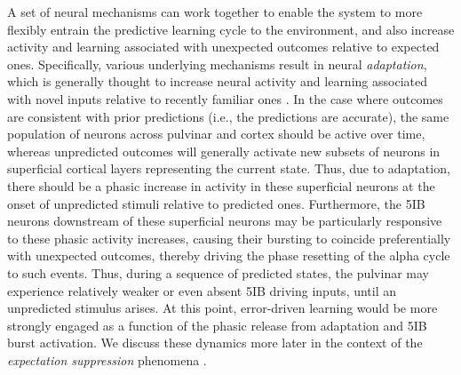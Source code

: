 \documentclass[11pt,twoside]{article}
\newif\myifpdf
\begin{document}
A set of neural mechanisms can work together to enable the system to more flexibly entrain the predictive learning cycle to the environment, and also increase activity and learning associated with unexpected outcomes relative to expected ones.  Specifically, various underlying mechanisms result in neural \emph{adaptation}, which is generally thought to increase neural activity and learning associated with novel inputs relative to recently familiar ones \citep{MullerMethaKrauskopfEtAl99,AbbottVarelaSenEtAl97,BretteGerstner05,Grill-SpectorHensonMartin06,Hennig13}.  In the case where outcomes are consistent with prior predictions (i.e., the predictions are accurate), the same population of neurons across pulvinar and cortex should be active over time, whereas unpredicted outcomes will generally activate new subsets of neurons in superficial cortical layers representing the current state.  Thus, due to adaptation, there should be a phasic increase in activity in these superficial neurons at the onset of unpredicted stimuli relative to predicted ones.  Furthermore, the 5IB neurons downstream of these superficial neurons may be particularly responsive to these phasic activity increases, causing their bursting to coincide preferentially with unexpected outcomes, thereby driving the phase resetting of the alpha cycle to such events.  Thus, during a sequence of predicted states, the pulvinar may experience relatively weaker or even absent 5IB driving inputs, until an unpredicted stimulus arises.  At this point, error-driven learning would be more strongly engaged as a function of the phasic release from adaptation and 5IB burst activation.  We discuss these dynamics more later in the context of the \emph{expectation suppression} phenomena \citep{SummerfieldTrittschuhMontiEtAl08,TodorovicEdeMarisEtAl11,MeyerOlson11,BastosUsreyAdamsEtAl12}.
\end{document}
